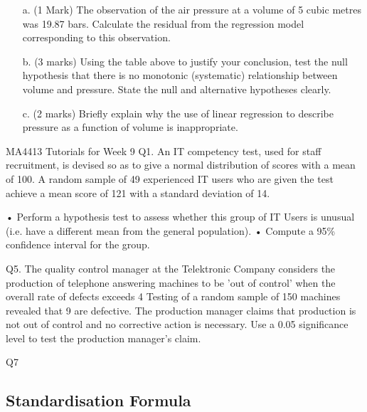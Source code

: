 \documentclass[]{report}
\begin{document}
\begin{enumerate}[(i)]
\begin{itemize}
\begin{itemize}
	\item[a.] (1 Mark) The observation of the air pressure at a volume of 5 cubic metres was 19.87 bars.
	Calculate the residual from the regression model corresponding to this observation.
	\item[b.] (3 marks) Using the table above to justify your conclusion, test the null hypothesis that there
	is no monotonic (systematic) relationship between volume and pressure. State the null
	and alternative hypotheses clearly.
	\item[c.] (2 marks) Briefly explain why the use of linear regression to describe pressure as a function
	of volume is inappropriate.
\end{itemize}










MA4413 Tutorials for Week 9
Q1. An IT competency test, used for staff recruitment, is devised so as to give a normal distribution of scores with a mean of 100. A random sample of 49 experienced IT users  who are given the test achieve a mean score of 121 with a standard deviation of 14. 

•	Perform a hypothesis test to assess whether this group of IT Users is unusual (i.e. have a different mean from the general population).
•	Compute a 95\% confidence interval for the group.



Q5. The quality control manager at the Telektronic Company considers the production of telephone answering machines to be ’out of control’ when the overall rate of defects exceeds 4%
Testing of a random sample of 150 machines revealed that 9 are defective. The production manager claims that production is not out of control and no corrective action is necessary. Use a 0.05 significance level to test the production manager’s claim.





Q7 






\subsection{Standardisation Formula}


\end{itemize}
\end{enumerate}
\end{document}
